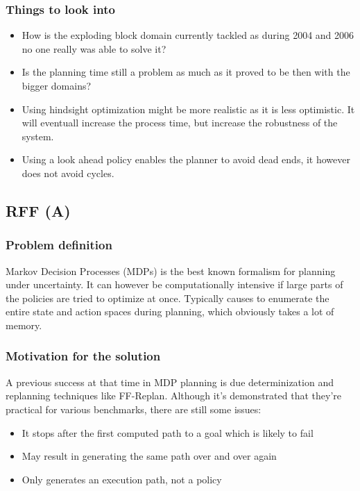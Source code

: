 \documentclass[runningheads,a4paper]{llncs}
\begin{document}
\subsubsection{Things to look into}
\begin{itemize}
	\item How is the exploding block domain currently tackled as during 2004 and 2006 no one really was able to solve it?
	\item Is the planning time still a problem as much as it proved to be then with the bigger domains?
	\item Using hindsight optimization might be more realistic as it is less optimistic. It will eventuall increase the process time, but increase the robustness of the system.
	\item Using a look ahead policy enables the planner to avoid dead ends, it however does not avoid cycles.
\end{itemize}

\subsection{RFF (A)}

\subsubsection{Problem definition}

Markov Decision Processes (MDPs) is the best known formalism for planning under
uncertainty. It can however be computationally intensive if large parts of the
policies are tried to optimize at once. Typically causes to enumerate the
entire state and action spaces during planning, which obviously takes a lot of
memory.

\subsubsection{Motivation for the solution}

A previous success at that time in MDP planning is due determinization and
replanning techniques like FF-Replan. Although it's demonstrated that they're
practical for various benchmarks, there are still some issues:

\begin{itemize}
	\item It stops after the first computed path to a goal which is likely to fail
	\item May result in generating the same path over and over again
	\item Only generates an execution path, not a policy
\end{itemize}
\end{document}
